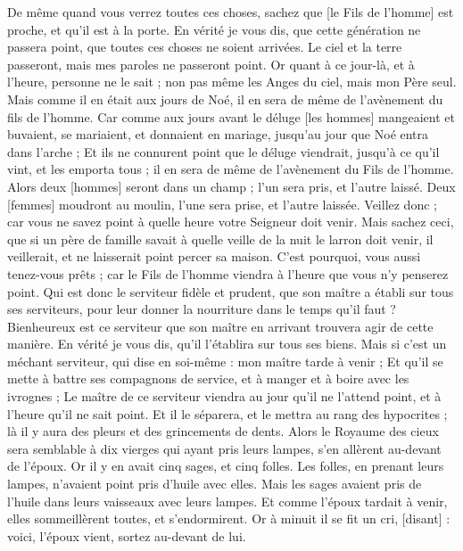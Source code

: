 \begin{multicols}{2}
De même quand vous verrez toutes ces choses, sachez que [le Fils de l'homme] est proche, et qu'il est à la porte.
En vérité je vous dis, que cette génération ne passera point, que toutes ces choses ne soient arrivées.
Le ciel et la terre passeront, mais mes paroles ne passeront point.
Or quant à ce jour-là, et à l'heure, personne ne le sait ; non pas même les Anges du ciel, mais mon Père seul.
Mais comme il en était aux jours de Noé, il en sera de même de l'avènement du fils de l'homme.
Car comme aux jours avant le déluge [les hommes] mangeaient et buvaient, se mariaient, et donnaient en mariage, jusqu'au jour que Noé entra dans l'arche ;
Et ils ne connurent point que le déluge viendrait, jusqu'à ce qu'il vint, et les emporta tous ; il en sera de même de l'avènement du Fils de l'homme.
Alors deux [hommes] seront dans un champ ; l'un sera pris, et l'autre laissé.
Deux [femmes] moudront au moulin, l'une sera prise, et l'autre laissée.
Veillez donc ; car vous ne savez point à quelle heure votre Seigneur doit venir.
Mais sachez ceci, que si un père de famille savait à quelle veille de la nuit le larron doit venir, il veillerait, et ne laisserait point percer sa maison.
C'est pourquoi, vous aussi tenez-vous prêts ; car le Fils de l'homme viendra à l'heure que vous n'y penserez point.
Qui est donc le serviteur fidèle et prudent, que son maître a établi sur tous ses serviteurs, pour leur donner la nourriture dans le temps qu'il faut ?
Bienheureux est ce serviteur que son maître en arrivant trouvera agir de cette manière.
En vérité je vous dis, qu'il l'établira sur tous ses biens.
Mais si c'est un méchant serviteur, qui dise en soi-même : mon maître tarde à venir ;
Et qu'il se mette à battre ses compagnons de service, et à manger et à boire avec les ivrognes ;
Le maître de ce serviteur viendra au jour qu'il ne l'attend point, et à l'heure qu'il ne sait point.
Et il le séparera, et le mettra au rang des hypocrites ; là il y aura des pleurs et des grincements de dents.
\VerseOne{}Alors le Royaume des cieux sera semblable à dix vierges qui ayant pris leurs lampes, s'en allèrent au-devant de l'époux.
Or il y en avait cinq sages, et cinq folles.
Les folles, en prenant leurs lampes, n'avaient point pris d'huile avec elles.
Mais les sages avaient pris de l'huile dans leurs vaisseaux avec leurs lampes.
Et comme l'époux tardait à venir, elles sommeillèrent toutes, et s'endormirent.
Or à minuit il se fit un cri, [disant] : voici, l'époux vient, sortez au-devant de lui.

\end{multicols}
